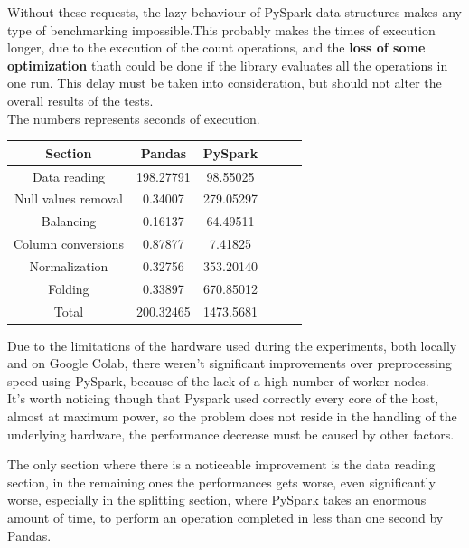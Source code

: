 \documentclass[
	letterpaper, %
	10pt, %
]{class}
\begin{document}
Without these requests, the lazy behaviour of PySpark data structures makes any type of benchmarking impossible.This probably makes the times of execution longer, due to
the execution of the count operations, and the \textbf{loss of some optimization} thath could be done if the library evaluates all the operations in one run.
This delay must be taken into consideration, but should not alter the overall results of the tests.\\

The numbers represents seconds of execution.

\begin{center}
    \begin{tabular}{ |c|c|c|c|c|c| }
        \hline
        Section             & Pandas    & PySpark   \\
        \hline
        Data reading        & 198.27791 & 98.55025  \\
        Null values removal & 0.34007   & 279.05297 \\
        Balancing           & 0.16137   & 64.49511  \\
        Column conversions  & 0.87877   & 7.41825   \\
        Normalization       & 0.32756   & 353.20140 \\
        Folding             & 0.33897   & 670.85012 \\
        Total               & 200.32465 & 1473.5681 \\
        \hline
    \end{tabular}
\end{center}


Due to the limitations of the hardware used during the experiments, both locally and on Google Colab, there weren't significant improvements over preprocessing speed using PySpark, because of the lack of a high number of worker nodes.\\
It's worth noticing though that Pyspark used correctly every core of the host, almost at maximum power, so the problem does not reside in the handling of the underlying hardware, the performance decrease must be caused by other factors.

The only section where there is a noticeable improvement is the data reading section, in the remaining ones the performances gets worse, even significantly worse, especially in the splitting section, where PySpark takes an enormous amount of time, to perform
an operation completed in less than one second by Pandas.\\
\end{document}
